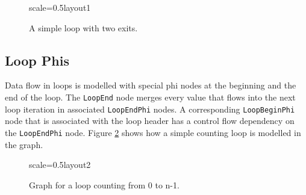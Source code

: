 \documentclass[twocolumn]{svjour3}
\newcommand\nodename[1]{\texttt{#1}}
\begin{document}
\begin{figure}[h]
  \label{fig:loop1}
  \centering
\begin{digraphenv}{scale=0.5}{layout1}
\end{digraphenv}
  \caption{A simple loop with two exits.}
\end{figure}

\subsection{Loop Phis}
Data flow in loops is modelled with special phi nodes at the beginning and the end of the loop.
The \nodename{LoopEnd} node merges every value that flows into the next loop iteration in associated \nodename{LoopEndPhi} nodes.
A corresponding \nodename{LoopBeginPhi} node that is associated with the loop header has a control flow dependency on the \nodename{LoopEndPhi} node.
Figure \ref{fig:loop2} shows how a simple counting loop is modelled in the graph.

\begin{figure}[h]
  \label{fig:loop2}
  \centering
\begin{digraphenv}{scale=0.5}{layout2}
\end{digraphenv}
  \caption{Graph for a loop counting from 0 to n-1.}
\end{figure}
\end{document}
